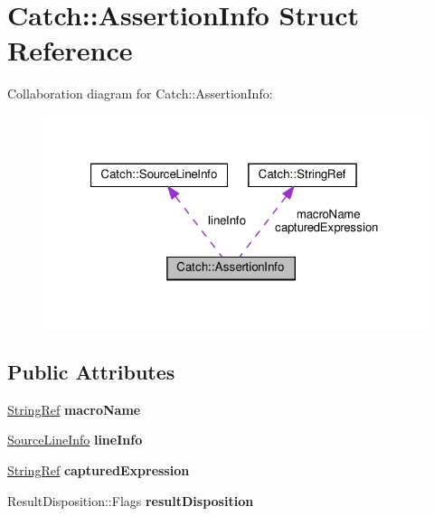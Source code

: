 \hypertarget{structCatch_1_1AssertionInfo}{}\section{Catch\+::Assertion\+Info Struct Reference}
\label{structCatch_1_1AssertionInfo}


Collaboration diagram for Catch\+::Assertion\+Info\+:\nopagebreak
\begin{figure}[H]
\begin{center}
\leavevmode
\includegraphics[width=321pt]{structCatch_1_1AssertionInfo__coll__graph}
\end{center}
\end{figure}
\subsection*{Public Attributes}
\begin{DoxyCompactItemize}
\item 
\mbox{\label{structCatch_1_1AssertionInfo_aaf3fbb9f1fe09c879ba3d877584e3056}} 
\mbox{\hyperlink{classCatch_1_1StringRef}{String\+Ref}} {\bfseries macro\+Name}
\item 
\mbox{\label{structCatch_1_1AssertionInfo_a17bdbb404ba12658034f833be2f4c3e7}} 
\mbox{\hyperlink{structCatch_1_1SourceLineInfo}{Source\+Line\+Info}} {\bfseries line\+Info}
\item 
\mbox{\label{structCatch_1_1AssertionInfo_accd36744b4acaa3a691a72df0b42190f}} 
\mbox{\hyperlink{classCatch_1_1StringRef}{String\+Ref}} {\bfseries captured\+Expression}
\item 
\mbox{\label{structCatch_1_1AssertionInfo_a60353b3632ab2f827162f2b2d6911073}} 
Result\+Disposition\+::\+Flags {\bfseries result\+Disposition}
\end{DoxyCompactItemize}


